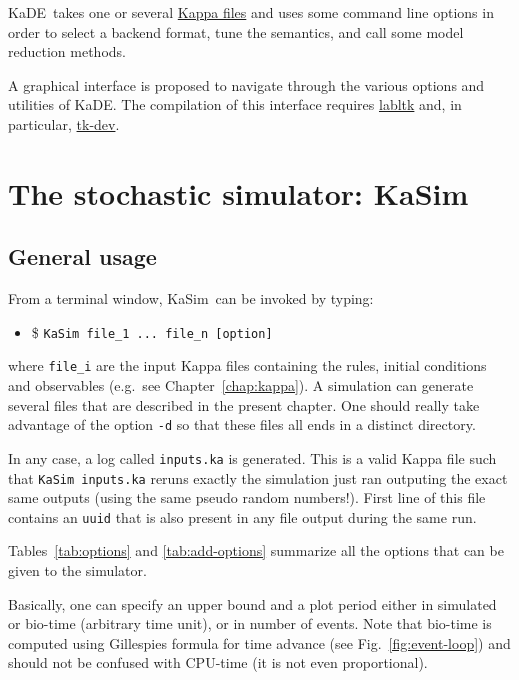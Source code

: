 \documentclass[11pt]{book}
\def\KaSim{\textsf{KaSim}}
\def\KaDE{\textsf{KaDE}}
\def\ttt#1{\texttt{#1}}
\def\eg{e.g.~}
\def\ITE#1{\begin{itemize}#1\end{itemize}}
\begin{document}
\KaDE~takes one or several \hyperref[chap:kappa]{Kappa files} and uses
some command line options in order to select a backend format, tune
the semantics, and call some model reduction methods.

A graphical interface is proposed to navigate through the various
options and utilities of \KaDE. The compilation of this interface
requires \href{https://forge.ocamlcore.org/projects/labltk/}{labltk}
and, in particular, \href{http://www.tcl.tk/}{tk-dev}.

\chapter{The stochastic simulator: \KaSim}\label{chap:cl}

\section{General usage}
From a terminal window, \KaSim~can be invoked by typing:
\ITE{
\item[\$] \ttt{KaSim file\_1 ... file\_n [option] } } where
\ttt{file\_i} are the input Kappa files containing the rules, initial
conditions and observables ({\eg}see Chapter~\ref{chap:kappa}). A
simulation can generate several files that are described in the present chapter. One
should really take advantage of the option \ttt{-d} so that these files  all
ends in a distinct directory.

In any case, a log called \ttt{inputs.ka} is generated. This is a
valid Kappa file such that \ttt{KaSim inputs.ka} reruns exactly the
simulation just ran outputing the exact same outputs (using the same
pseudo random numbers!). First line of this file contains an \ttt{uuid}
that is also present in any file output during the same run.

Tables~\ref{tab:options} and \ref{tab:add-options} summarize all the
options that can be given to the simulator.

Basically, one can specify an upper bound and a plot period either in
simulated or bio-time (arbitrary time unit), or in number of events.
Note that bio-time is computed using
Gillespie{\textquotesingle}s formula for time advance (see
Fig.~\ref{fig:event-loop}) and should not be confused with CPU-time
(it is not even proportional).
\end{document}
